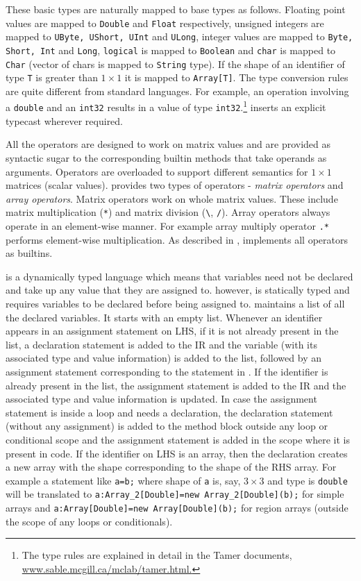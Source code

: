 These basic types are naturally mapped to \xten base types as follows.  Floating
point values are mapped to \verb|Double| and \verb|Float| respectively, unsigned
integers are mapped to \verb|UByte, UShort, UInt| and \verb|ULong|, integer
values are mapped to \verb|Byte, Short, Int| and \verb|Long|, \verb|logical| is
mapped to \verb|Boolean| and \verb|char| is mapped to \verb|Char| (vector of
chars is mapped to \verb|String| type). If the shape of an identifier of type
\verb|T| is greater than $1\times1$ it is mapped to \verb|Array[T]|.  The type
conversion rules are quite different from standard languages.  For example, an
operation involving a \verb|double| and an \verb|int32| results in a value of
type \verb|int32|.\footnote{The type rules are explained in detail in the Tamer
documents, \url{www.sable.mcgill.ca/mclab/tamer.html.}}  \mixten inserts an
explicit typecast wherever required.
  
All the \matlab operators are designed to work on matrix values and are provided
as syntactic sugar to the corresponding builtin methods that take operands as
arguments.  Operators are overloaded to support different semantics for
$1\times1$ matrices (scalar values). \matlab provides two types of operators -
\emph{matrix operators} and \emph{array operators}. Matrix operators work on
whole matrix values.  These include matrix multiplication (\verb+*+) and matrix
division (\verb+\+, \verb+/+). Array operators always operate in an element-wise
manner. For example array multiply operator \verb+.*+ performs element-wise
multiplication. As described in , \mixten implements all
operators as builtins.

\matlab is a dynamically typed language which means that variables need
not be declared and take up any value that they are assigned to. \xten
however, is statically typed and requires variables to be declared before
being assigned to. \mixten maintains a list of all the declared
variables. It starts with an empty list. Whenever an identifier appears
in an assignment statement on LHS, if it is not already present in the
list, a declaration statement is added to the \xten IR and the variable
(with its associated type and value information) is added to the list, followed
by an assignment statement corresponding to the statement in \matlab.
If the identifier is already present in the list, the assignment statement is
added to the \xten IR and the associated type and value information is
updated. In case the \matlab assignment statement is inside a loop and
needs a declaration, the declaration statement (without any assignment)
is added to the method block outside any loop or conditional scope and
the assignment statement is added in the scope where it is present in
\matlab code. If the identifier on LHS is an array, then the declaration
creates a new array with the shape corresponding to the shape of the
RHS array. For example a \matlab statement like \verb|a=b;| where shape of
\verb|a| is, say, $3\times3$ and type is \verb|double| will be
translated to \verb|a:Array_2[Double]=new Array_2[Double](b);| for simple arrays
and \verb|a:Array[Double]=new Array[Double](b);| for region arrays
(outside the scope of any loops or conditionals). 
 
